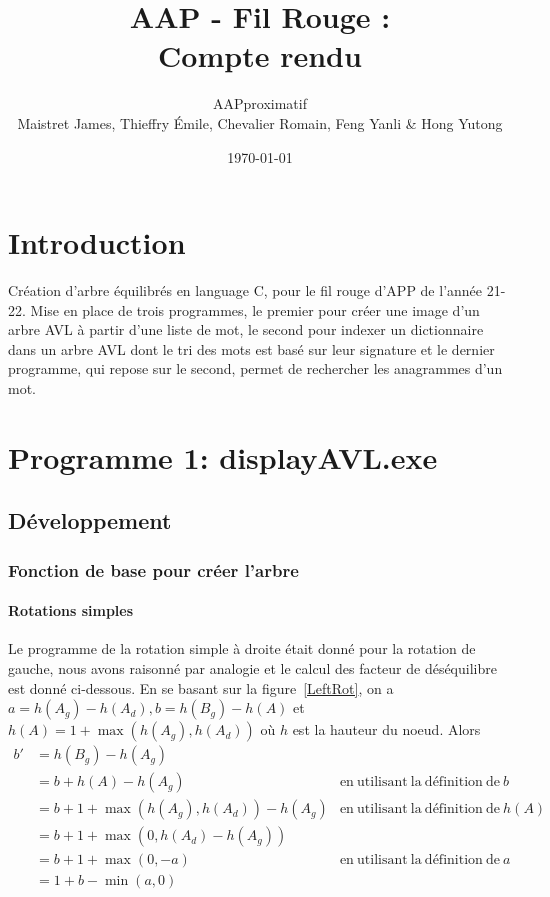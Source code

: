 \documentclass{article} %
\title{AAP - Fil Rouge :\\ Compte rendu}
\author{AAPproximatif \\ Maistret James, Thieffry \'Emile, Chevalier Romain, Feng Yanli \&  Hong Yutong}
\date{\today}
\begin{document}
\maketitle
\setcounter{secnumdepth}{3}
\setcounter{tocdepth}{3}

\tableofcontents
\listoffigures

\newpage

\section{Introduction}

Création d'arbre équilibrés en language C, pour le fil rouge d'APP de l'année 21-22. Mise en place de trois programmes, le premier pour créer une image d'un arbre AVL à partir d'une liste de mot, le second pour indexer un dictionnaire dans un arbre AVL dont le tri des mots est basé sur leur signature et le dernier programme, qui repose sur le second, permet de rechercher les anagrammes d'un mot. 

\section{Programme 1: displayAVL.exe}
\subsection{Développement}
\subsubsection{Fonction de base pour créer l'arbre}
\paragraph{Rotations simples} Le programme de la rotation simple à droite était donné pour la rotation de gauche, nous avons raisonné par analogie et le calcul des facteur de déséquilibre est donné ci-dessous. En se basant sur la figure~\ref{LeftRot}, on a \( a = h(A_g) - h(A_d), b = h(B_g) - h(A)\) et \(h(A) = 1 +\max (h(A_g), h(A_d)) \) où \(h\) est la hauteur du noeud. Alors 
\begin{align*}
b' &= h(B_g)-h(A_g) \\
&= b + h(A) - h(A_g) & \mathrm{en\  utilisant \ la \  définition \  de } \ b  \\
&= b +  1 +\max (h(A_g), h(A_d)) - h(A_g) & \mathrm{en \ utilisant \ la \ définition\ de} \ h(A)  \\
&= b + 1 + \max(0, h(A_d)-h(A_g))\\
&= b + 1 + \max(0, -a) & \mathrm{en\  utilisant \ la \  définition \  de } \ a \\
&= 1+ b -\min(a,0)
\end{align*} %
\end{document}
